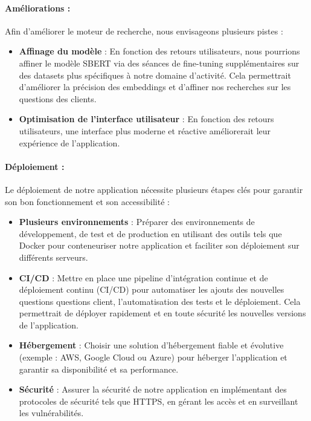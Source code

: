 \documentclass[12pt]{article}
\theoremstyle{definition}
\begin{document}
\paragraph{Améliorations :}

Afin d'améliorer le moteur de recherche, nous envisageons plusieurs pistes :

\begin{itemize}
	\item \textbf{Affinage du modèle} : En fonction des retours utilisateurs, nous pourrions affiner le modèle SBERT via des séances de fine-tuning supplémentaires sur des datasets plus spécifiques à notre domaine d'activité. Cela permettrait d'améliorer la précision des embeddings et d'affiner nos recherches sur les questions des clients.
	\item \textbf{Optimisation de l'interface utilisateur} : En fonction des retours utilisateurs, une interface plus moderne et réactive améliorerait leur expérience de l'application.

\end{itemize}

\paragraph{Déploiement :}

Le déploiement de notre application nécessite plusieurs étapes clés pour garantir son bon fonctionnement et son accessibilité :

\begin{itemize}
	\item \textbf{Plusieurs environnements} : Préparer des environnements de développement, de test et de production en utilisant des outils tels que Docker pour conteneuriser notre application et faciliter son déploiement sur différents serveurs.
	\item \textbf{CI/CD} : Mettre en place une pipeline d'intégration continue et de déploiement continu (CI/CD) pour automatiser les ajouts des nouvelles questions questions client, l'automatisation des tests et le déploiement. Cela permettrait de déployer rapidement et en toute sécurité les nouvelles versions de l'application.
	\item \textbf{Hébergement} : Choisir une solution d'hébergement fiable et évolutive (exemple : AWS, Google Cloud ou Azure) pour héberger l'application et garantir sa disponibilité et sa performance.
	\item \textbf{Sécurité} : Assurer la sécurité de notre application en implémentant des protocoles de sécurité tels que HTTPS, en gérant les accès et en surveillant les vulnérabilités.
\end{itemize}
\end{document}
